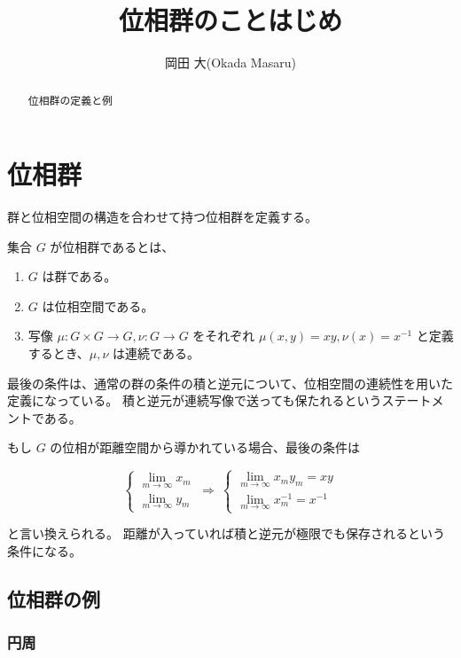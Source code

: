 \documentclass[uplatex,a4j,12pt,dvipdfmx]{jsarticle}
\title{
位相群のことはじめ
}
\author{
岡田 大(Okada Masaru)
}
\begin{document}
\maketitle


\begin{abstract}
	位相群の定義と例
\end{abstract}

\section{位相群}

群と位相空間の構造を合わせて持つ位相群を定義する。

集合 $G$ が位相群であるとは、

\begin{enumerate}
	\item $G$ は群である。
	\item $G$ は位相空間である。
	\item 写像 $\mu: G \times G \to G, \nu: G \to G$ をそれぞれ $\mu(x,y)=xy, \nu(x) = x^{-1}$ と定義するとき、$\mu,\nu$ は連続である。
\end{enumerate}

最後の条件は、通常の群の条件の積と逆元について、位相空間の連続性を用いた定義になっている。
積と逆元が連続写像で送っても保たれるというステートメントである。


もし $G$ の位相が距離空間から導かれている場合、最後の条件は

\[
	\left\{
	\begin{array}{r}
		\displaystyle \lim_{ m \to \infty } x_{m} \\
		\displaystyle \lim_{ m \to \infty } y_{m}
	\end{array}
	\right.
	\ \Rightarrow \
	\left\{
	\begin{array}{r}
		\displaystyle \lim_{m \to \infty } x_{m} y_{m} = xy \\
		\displaystyle \lim_{m \to \infty } x_{m}^{-1} = x^{-1}
	\end{array}
	\right.
\]

と言い換えられる。
距離が入っていれば積と逆元が極限でも保存されるという条件になる。





\subsection{位相群の例}

\subsubsection{円周}
\end{document}
